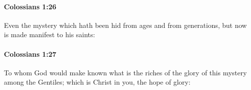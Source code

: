 		\paragraph{Colossians 1:26} %
			\label{COLOSSIANS-1-26}

			Even the mystery which hath been hid from ages and from generations, but now is made manifest to his saints:

			\begin{framed}
			\scriptsize
				\begin{compactdesc}
					\item[SBLG] 
				\end{compactdesc}
			\end{framed}

		\paragraph{Colossians 1:27} %
			\label{COLOSSIANS-1-27}

			To whom God would make known what is the riches of the glory of this mystery among the Gentiles; which is Christ in you, the hope of glory:

